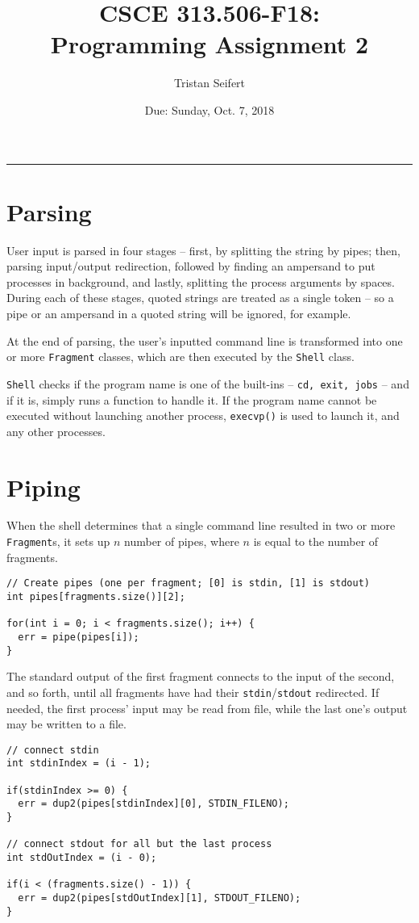\documentclass[10pt]{article}
\title{CSCE 313.506-F18: \\Programming Assignment 2}
\author{Tristan Seifert}
\date{Due: Sunday, Oct. 7, 2018}
\begin{document}
\maketitle

\hrule

\section{Parsing}
User input is parsed in four stages – first, by splitting the string by pipes; then, parsing input/output redirection, followed by finding an ampersand to put processes in background, and lastly, splitting the process arguments by spaces. During each of these stages, quoted strings are treated as a single token -- so a pipe or an ampersand in a quoted string will be ignored, for example.

At the end of parsing, the user's inputted command line is transformed into one or more \texttt{Fragment} classes, which are then executed by the \texttt{Shell} class.

\texttt{Shell} checks if the program name is one of the built-ins -- \texttt{cd, exit, jobs} -- and if it is, simply runs a function to handle it. If the program name cannot be executed without launching another process, \texttt{execvp()} is used to launch it, and any other processes.


\section{Piping}
When the shell determines that a single command line resulted in two or more \texttt{Fragment}s, it sets up $n$ number of pipes, where $n$ is equal to the number of fragments.

\begin{verbatim}
// Create pipes (one per fragment; [0] is stdin, [1] is stdout)
int pipes[fragments.size()][2];

for(int i = 0; i < fragments.size(); i++) {
  err = pipe(pipes[i]);
}
\end{verbatim}

The standard output of the first fragment connects to the input of the second, and so forth, until all fragments have had their \texttt{stdin}/\texttt{stdout} redirected. If needed, the first process' input may be read from file, while the last one's output may be written to a file.

\begin{verbatim}
// connect stdin
int stdinIndex = (i - 1);

if(stdinIndex >= 0) {
  err = dup2(pipes[stdinIndex][0], STDIN_FILENO);
}

// connect stdout for all but the last process
int stdOutIndex = (i - 0);

if(i < (fragments.size() - 1)) {
  err = dup2(pipes[stdOutIndex][1], STDOUT_FILENO);
}
\end{verbatim}
\end{document}
